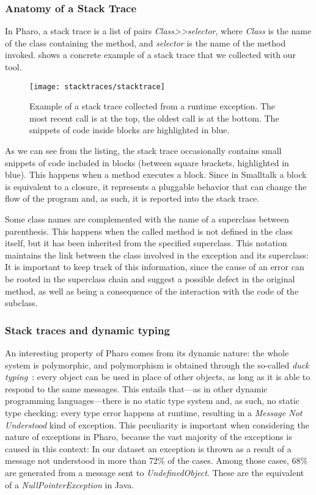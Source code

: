 \subsubsection{Anatomy of a Stack Trace}

In Pharo, a stack trace is a list of pairs \textit{Class{>}{>}selector}, where \textit{Class} is the name of the class containing the method, and \textit{selector} is the name of the method invoked.
 shows a concrete example of a stack trace that we collected with our tool.

\begin{figure}[ht]
\begin{center}
  \texttt{[image: stacktraces/stacktrace]}
  \caption{Example of a stack trace collected from a runtime exception.
The most recent call is at the top, the oldest call is at the bottom.
The snippets of code inside blocks are highlighted in blue.}
  \label{fig:stacktrace}
\end{center}
\end{figure}

As we can see from the listing, the stack trace occasionally contains small snippets of code included in blocks (between square brackets, highlighted in blue).
This happens when a method executes a block.
Since in Smalltalk a block is equivalent to a closure, it represents a pluggable behavior that can change the flow of the program and, as such, it is reported into the stack trace.

Some class names are complemented with the name of a superclass between parenthesis.
This happens when the called method is not defined in the class itself, but it has been inherited from the specified superclass.
This notation maintains the link between the class involved in the exception and its superclass: It is important to keep track of this information, since the cause of an error can be rooted in the superclass chain and suggest a possible defect in the original method, as well as being a consequence of the interaction with the code of the subclass.

\subsubsection{Stack traces and dynamic typing}

An interesting property of Pharo comes from its dynamic nature: the whole system is polymorphic, and polymorphism is obtained through the so-called \emph{duck typing}~\cite{Chugh2012}: every object can be used in place of other objects, as long as it is able to respond to the same messages.
This entails that---as in other dynamic programming languages---there is no static type system and, as such, no static type checking: every type error happens at runtime, resulting in a \emph{Message Not Understood} kind of exception.
This peculiarity is important when considering the nature of exceptions in Pharo, because the vast majority of the exceptions is caused in this context: In our dataset an exception is thrown as a result of a message not understood in more than 72\% of the cases.
Among those cases, 68\% are generated from a message sent to \emph{UndefinedObject}.
These are the equivalent of a \emph{NullPointerException} in Java.

